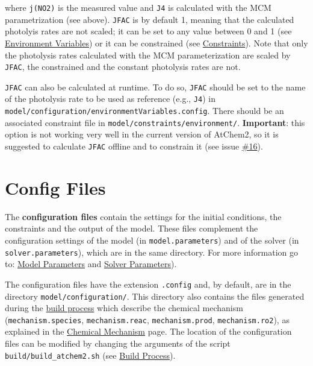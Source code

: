 where \texttt{j(NO2)} is the measured value and \texttt{J4} is
calculated with the MCM parametrization (see above). \texttt{JFAC} is
by default 1, meaning that the calculated photolyis rates are not
scaled; it can be set to any value between 0 and 1 (see
\hyperref[sec:environment-variables]{Environment Variables}) or it can be constrained
(see \hyperref[sec:constraints]{Constraints}). Note that only the
photolysis rates calculated with the MCM parameterization are scaled
by \texttt{JFAC}, the constrained and the constant photolysis rates
are not.

\texttt{JFAC} can also be calculated at runtime. To do so,
\texttt{JFAC} should be set to the name of the photolysis rate to be
used as reference (e.g., \texttt{J4}) in\\
\texttt{model/configuration/environmentVariables.config}. There should
be an associated constraint file in
\texttt{model/constraints/environment/}. \textbf{Important}: this
option is not working very well in the current version of AtChem2, so
it is suggested to calculate \texttt{JFAC} offline and to constrain it
(see issue \href{https://github.com/AtChem/AtChem2/issues/16}{\#16}).

\section{Config Files} \label{sec:config-files}

The \textbf{configuration files} contain the settings for the initial
conditions, the constraints and the output of the model. These files
complement the configuration settings of the model (in
\texttt{model.parameters}) and of the solver (in
\texttt{solver.parameters}), which are in the same directory. For more
information go to: \hyperref[sec:model-parameters]{Model Parameters} and
\hyperref[sec:solver-parameters]{Solver Parameters}).

The configuration files have the extension \texttt{.config} and, by
default, are in the directory \texttt{model/configuration/}. This
directory also contains the files generated during the
\hyperref[subsec:build-process]{build process} which describe the
chemical mechanism (\texttt{mechanism.species},
\texttt{mechanism.reac}, \texttt{mechanism.prod},
\texttt{mechanism.ro2}), as explained in the
\hyperref[sec:chemical-mechanism]{Chemical Mechanism} page. The location of the
configuration files can be modified by changing the arguments of the
script \texttt{build/build\_atchem2.sh} (see
\hyperref[subsec:build-process]{Build Process}).

